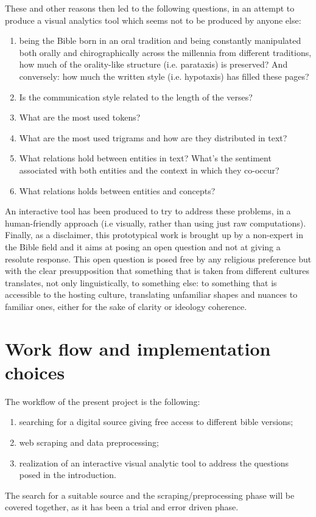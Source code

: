 \documentclass[sigchi]{article}
\begin{document}
These and other reasons then led to the following questions, in an attempt to produce a visual analytics tool which seems not to be produced by anyone else:
\begin{enumerate}
    \item being the Bible born in an oral tradition  and being constantly manipulated both orally and chirographically across the millennia from different traditions, 
how much of the orality-like structure (i.e. parataxis)  is preserved? And conversely: how much the written style (i.e. hypotaxis) has filled these pages?
\item Is the communication style related to the length of the verses?
\item What are the most used tokens?
\item What are the most used trigrams and how are they distributed in text?
\item What relations hold between entities in text? What’s the sentiment associated with both entities and the context in which they co-occur?
\item What relations holds between entities and concepts?
\end{enumerate}


An interactive tool has been produced to try to address these problems, in a human-friendly approach (i.e visually, rather than using just raw computations).
Finally, as a disclaimer, this prototypical work is brought up by a non-expert in the Bible field and it aims at posing an open question and not at giving a resolute response. This open question is posed free by any religious preference but with the clear presupposition that something that is taken from different cultures translates, not only linguistically, to something else: to something that is accessible to the hosting culture, translating unfamiliar shapes and nuances to familiar ones, either for the sake of clarity or ideology coherence.


\section{Work flow and implementation choices}
The workflow of the present project is the following:
\begin{enumerate}
   \item searching for a digital source giving free access to different bible versions;
   \item web scraping and data preprocessing;
   \item realization of an interactive visual analytic tool to address the questions posed in the introduction.
\end{enumerate}
The search for a suitable source and the scraping/preprocessing phase will be covered together, as it has been a trial and error driven phase. \\ \\
\end{document}
